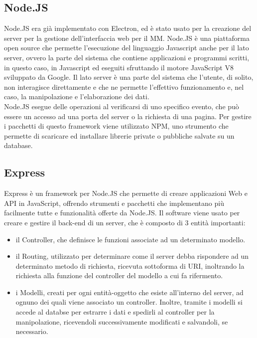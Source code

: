 \subsection{Node.JS}
Node.JS era gi\`a implementato con Electron, ed \`e stato usato per la creazione del server
per la gestione dell'interfaccia web per il MM.
Node.JS \`e una piattaforma open source che permette l'esecuzione del linguaggio Javascript
anche per il lato server, ovvero
la parte del sistema che contiene applicazioni e programmi  scritti, in questo caso, in Javascript
ed eseguiti sfruttando il motore JavaScript V8 sviluppato da Google.
Il lato server \`e una parte del sistema che l'utente, di solito, non interagisce direttamente
e che ne permette l'effettivo funzionamento e, nel caso, la manipolazione e l'elaborazione
dei dati.\\
Node.JS esegue delle operazioni al verificarsi di uno specifico evento, che pu\`o essere un accesso ad una porta
del server o la richiesta di una pagina.
Per gestire i pacchetti di questo framework viene utilizzato NPM\cite{NPM}, uno strumento che permette
di scaricare ed installare librerie private o pubbliche salvate su un database.
\\[1\baselineskip]

\subsection{Express}\label{cap:express}
Express \`e un framework per Node.JS che permette di creare applicazioni Web e API in JavaScript, offrendo strumenti e pacchetti
che implementano pi\`u facilmente tutte e funzionalità offerte da Node.JS.
Il software viene usato per creare e gestire il back-end di un server, che \`e composto di 3 entit\`a importanti:
\begin{itemize}
\item il Controller, che definisce le funzioni associate ad un determinato modello.
\item il Routing, utilizzato per determinare come il server debba rispondere ad un determinato metodo di richiesta,
ricevuta sottoforma di URI, inoltrando la richiesta alla funzione del controller del modello a cui fa rifermento.
\item i Modelli, creati per ogni entit\`a-oggetto che esiste all'interno del server, ad ognuno dei quali viene associato
un controller. Inoltre, tramite i modelli si accede al databse per estrarre i dati e spedirli al controller per
la manipolazione, ricevendoli successivamente modificati e salvandoli, se necessario.
\\[2\baselineskip]
\end{itemize}

